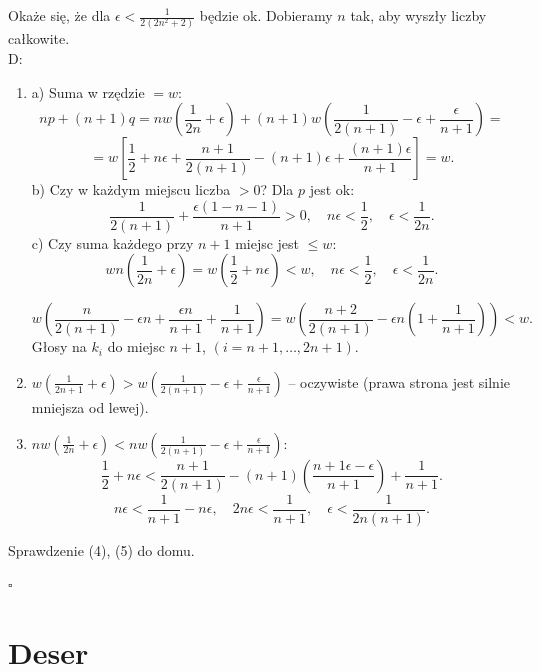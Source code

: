 \documentclass[12pt,a4paper]{article}
\theoremstyle{break}
\begin{document}
	
	Okaże się, że dla $\epsilon < \frac{1}{2(2n^2+2)}$ będzie ok. Dobieramy $n$ tak, aby wyszły liczby całkowite.\\
	
	D:
	
	\begin{enumerate}[1)]
		\item  a) Suma w rzędzie $= w$:
		\[
		np + (n+1)q = nw\left(\frac{1}{2n}+\epsilon\right) + (n+1)w\left(\frac{1}{2(n+1)}-\epsilon + \frac{\epsilon}{n+1}\right) =\]\[ =w\left[\frac{1}{2} + n\epsilon + \frac{n+1}{2(n+1)} - (n+1)\epsilon + \frac{(n+1)\epsilon}{n+1}\right] = w.
		\]
		b) Czy w każdym miejscu liczba $> 0$? Dla $p$ jest ok:
		\[
		\frac{1}{2(n+1)} + \frac{\epsilon(1-n-1)}{n+1} > 0, \quad n\epsilon < \frac{1}{2}, \quad \epsilon < \frac{1}{2n}.
		\]
		c) Czy suma każdego przy $n+1$ miejsc jest $\leq w$:
		\[
		wn\left(\frac{1}{2n}+\epsilon\right) = w\left(\frac{1}{2} + n\epsilon\right) < w, \quad n\epsilon < \frac{1}{2}, \quad \epsilon < \frac{1}{2n}.
		\]
		
		\[
		w\left(\frac{n}{2(n+1)}-\epsilon n + \frac{\epsilon n}{n+1}+\frac{1}{n+1}\right) = w\left(\frac{n+2}{2(n+1)}-\epsilon n\left(1+\frac{1}{n+1}\right)\right) < w.
		\]
		Głosy na $k_i$ do miejsc $n+1$, $(i=n+1, \dots, 2n+1)$.
		
		\item  $w\left(\frac{1}{2n+1}+\epsilon\right) > w\left(\frac{1}{2(n+1)}-\epsilon + \frac{\epsilon}{n+1}\right)$ -- oczywiste (prawa strona jest silnie mniejsza od lewej).
		
		\item  $nw\left(\frac{1}{2n}+\epsilon\right) < nw\left(\frac{1}{2(n+1)} -\epsilon + \frac{\epsilon}{n+1}\right)$:
		\[
		\frac{1}{2} + n\epsilon < \frac{n+1}{2(n+1)} - (n+1)\left(\frac{n+1\epsilon - \epsilon}{n+1}\right) + \frac{1}{n+1}.
		\]
		\[
		n\epsilon < \frac{1}{n+1} - n\epsilon, \quad 2n\epsilon < \frac{1}{n+1}, \quad \epsilon < \frac{1}{2n(n+1)}.
		\]
	\end{enumerate}
	
	Sprawdzenie (4), (5) do domu.
	
	\begin{flushright}
		$\square$
	\end{flushright}
	
	
	
	\newpage
	\section{Deser}
	
\end{document}
